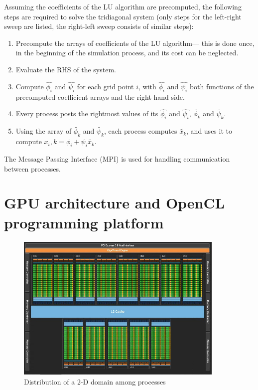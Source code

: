 \documentclass{article}
\begin{document}
    Assuming the coefficients of the LU algorithm are precomputed,
    the following steps are required to solve the tridiagonal system
    (only steps for the left-right sweep are listed, the right-left sweep
    consists of similar steps):

    \begin{enumerate}
    \item Precompute the arrays of coefficients of the LU algorithm---
    this is done once, in the beginning of the simulation process, and its cost
    can be neglected.
    \item Evaluate the RHS of the system.
    \item Compute $\hat{\phi_i}$ and $\hat{\psi_i}$ for each grid point $i$,
    with $\hat{\phi_i}$ and $\hat{\psi_i}$ both functions of the precomputed
    coefficient arrays and the right hand side.
    \item Every process posts the rightmost values of its $\hat{\phi_i}$ and $\hat{\psi_i}$,
        $\widetilde{\phi_k}$ and $\widetilde{\psi_k}$.
    \item Using the array of $\widetilde{\phi_k}$ and $\widetilde{\psi_k}$,
        each process computes $\widetilde{x_k}$, and uses it to compute
        $x_i,k = \phi_i + \psi_i\widetilde{x_k}$.
    \end{enumerate}

    The Message Passing Interface (MPI) is used for handling communication
    between processes.

\section{GPU architecture and OpenCL programming platform}

    \begin{figure}[h]
    \begin{center}
    \includegraphics[height=200pt]{img/tesla-block-diagram.jpg}
    \end{center}
    \caption{Distribution of a 2-D domain among processes}
    \label{fig:da-domain}
    \end{figure}
\end{document}
